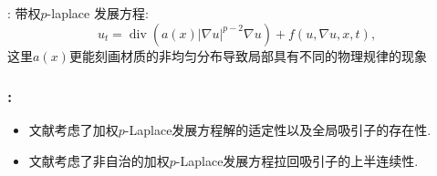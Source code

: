 \documentclass[UTF8]{ctexbeamer}
\newcommand*\abs[1]{\lvert#1\rvert}
\DeclareMathOperator{\Div}{div}
\begin{document}
\begin{frame}{\secname : \subsecname}
    带权$p$-laplace 发展方程:
    \begin{equation*}
        u_t = \Div(a(x)\abs{\nabla u}^{p-2}\nabla u) + f(u, \nabla u, x, t),
    \end{equation*}
    这里$a(x)$更能刻画材质的非均匀分布导致局部具有不同的物理规律的现象
\end{frame}
\begin{frame}
    \frametitle{\secname : \subsecname}

    \begin{itemize}
        \item 文献考虑了加权$p$-Laplace发展方程解的适定性以及全局吸引子的存在性.
        \item 文献考虑了非自治的加权$p$-Laplace发展方程拉回吸引子的上半连续性.
    \end{itemize}

\end{frame}
\end{document}
